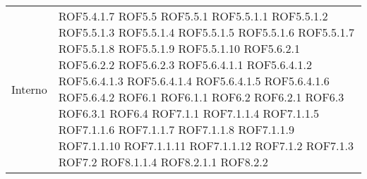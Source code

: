 \begin{center}
\begin{longtable}{| p{4cm} | p{4cm} |}
\hline
Interno & ROF5.4.1.7 \newline ROF5.5 \newline ROF5.5.1 \newline ROF5.5.1.1 \newline ROF5.5.1.2 \newline ROF5.5.1.3 \newline ROF5.5.1.4 \newline ROF5.5.1.5 \newline ROF5.5.1.6 \newline ROF5.5.1.7 \newline ROF5.5.1.8 \newline ROF5.5.1.9 \newline ROF5.5.1.10 \newline ROF5.6.2.1 \newline ROF5.6.2.2 \newline ROF5.6.2.3 \newline ROF5.6.4.1.1 \newline ROF5.6.4.1.2 \newline ROF5.6.4.1.3 \newline ROF5.6.4.1.4 \newline ROF5.6.4.1.5 \newline ROF5.6.4.1.6 \newline ROF5.6.4.2 \newline ROF6.1 \newline ROF6.1.1 \newline ROF6.2 \newline ROF6.2.1 \newline ROF6.3 \newline ROF6.3.1 \newline ROF6.4 \newline ROF7.1.1 \newline ROF7.1.1.4 \newline ROF7.1.1.5 \newline ROF7.1.1.6 \newline ROF7.1.1.7 \newline ROF7.1.1.8 \newline ROF7.1.1.9 \newline ROF7.1.1.10 \newline ROF7.1.1.11 \newline ROF7.1.1.12 \newline ROF7.1.2 \newline ROF7.1.3 \newline ROF7.2 \newline ROF8.1.1.4 \newline ROF8.2.1.1 \newline ROF8.2.2 \\

\end{longtable}
\end{center}
